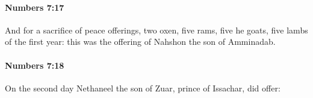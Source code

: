 		\paragraph{Numbers 7:17} %
			\label{NUMBERS-7-17}

			And for a sacrifice of peace offerings, two oxen, five rams, five he goats, five lambs of the first year: this was the offering of Nahshon the son of Amminadab.


		\paragraph{Numbers 7:18} %
			\label{NUMBERS-7-18}

			On the second day Nethaneel the son of Zuar, prince of Issachar, did offer:



